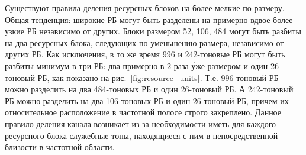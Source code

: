 Существуют правила деления ресурсных блоков на более мелкие по размеру. 
Общая тенденция: широкие РБ могут быть разделены на примерно вдвое более узкие РБ независимо от других.
Блоки размером 52, 106, 484 могут быть разбиты на два ресурсных блока, следующих по уменьшению размера, независимо от других РБ. 
Как исключения, в то же время 996 и 242-тоновые РБ могут быть разбиты минимум в три РБ: два примерно в 2 раза \'{у}же размером и один 26-тоновый РБ, как показано на рис.~\ref{fig:resource_units}. 
Т.е. 996-тоновый РБ можно разделить на два 484-тоновых РБ и один 26-тоновый РБ. А 242-тоновый РБ можно разделить на два 106-тоновых РБ и один 26-тоновый РБ, причем их относительное расположение в частотной полосе строго закреплено. Данное правило деления канала возникает из-за необходимости иметь для каждого ресурсного блока служебные тоны, находящиеся с ним в непосредственной близости в частотной области. 
